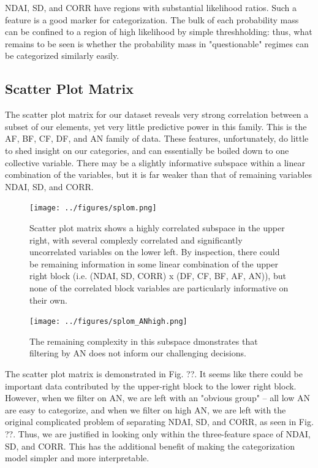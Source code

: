 \documentclass[english]{article}\usepackage{graphicx, color}
\numberwithin{equation}{section}
\numberwithin{figure}{section}
\begin{document}
NDAI, SD, and CORR have regions with substantial likelihood ratios. Such a 
feature is a good marker for categorization. The bulk of each probability mass 
can be confined to a region of high likelihood by simple threshholding: thus, 
what remains to be seen is whether the probability mass in "questionable" 
regimes can be categorized similarly easily.

\subsection{Scatter Plot Matrix}
The scatter plot matrix for our dataset reveals very strong correlation between
a subset of our elements, yet very little predictive power in this family. This is
the AF, BF, CF, DF, and AN family of data. These features, unfortunately, do
little to shed insight on our categories, and can essentially be boiled down to
one collective variable. There may be a slightly informative subspace within a
linear combination of the variables, but it is far weaker than that of remaining
variables NDAI, SD, and CORR.

\begin{figure}[!h]
  \begin{center}
    \texttt{[image: ../figures/splom.png]}
  \end{center}
  \caption{Scatter plot matrix shows a highly correlated subspace in the upper 
	right, with several complexly correlated and significantly uncorrelated
	variables on the lower left. By inspection, there could be remaining 
	information in some linear combination of the upper right block (i.e. 
	(NDAI, SD, CORR) x (DF, CF, BF, AF, AN)), but none of the correlated 
	block variables are particularly informative on their own.}
  \label{fig:PT}
\end{figure}

\begin{figure}[!h]
  \begin{center}
    \texttt{[image: ../figures/splom\_ANhigh.png]}
  \end{center}
  \caption{The remaining complexity in this subspace dmonstrates that filtering 
	by AN does not inform our challenging decisions.}
  \label{fig:PT}
\end{figure}

The scatter plot matrix is demonstrated in Fig. ??. It seems like there could be 
important data contributed by the upper-right block to the lower right block. 
However, when we filter on AN, we are left with an "obvious group" -- all low 
AN are easy to categorize, and when we filter on high AN, we are left with the 
original complicated problem of separating NDAI, SD, and CORR, as seen in 
Fig. ??. Thus, we are justified in looking only within the three-feature space of
NDAI, SD, and CORR. This has the additional benefit of making the 
categorization model simpler and more interpretable.
\end{document}
